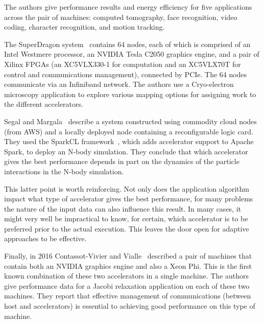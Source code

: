 The authors give performance results and energy efficiency for five
applications across the pair of machines:
computed tomography, face recognition, video coding, character recognition,
and motion tracking.

The SuperDragon system~\cite{tzwz15} contains 64 nodes, each of which is
comprised of an Intel Westmere processor, an NVIDIA Tesla C2050 graphics
engine, and a pair of Xilinx FPGAs (an XC5VLX330-1 for computation and an
XC5VLX70T for control and communications management), connected by
PCIe. The 64 nodes communicate via
an Infiniband network. The authors use a Cryo-electron microscopy
application to explore various mapping options for assigning work to the
different accelerators.

Segal and Margala~\cite{sm16} describe a system constructed using commodity cloud
nodes (from AWS) and a locally deployed node containing a reconfigurable logic
card.  They used the SparkCL framework~\cite{sparkcl}, which adds accelerator
support to Apache Spark, to deploy an N-body simulation. They conclude that
which accelerator gives the best performance depends in part on the dynamics
of the particle interactions in the N-body simulation.

This latter point is worth reinforcing. Not only does the application
algorithm impact what type of accelerator gives the best performance, for
many problems the nature of the input data can also influence this result.
In many cases, it might very well be impractical to know, for certain,
which accelerator is to be preferred prior to the actual execution.
This leaves the door open for adaptive approaches to be effective.

Finally, in 2016 Contassot-Vivier and Vialle~\cite{cv16} described
a pair of machines
that contain both an NVIDIA graphics engine and also a Xeon Phi. This is
the first known combination of these two accelerators in a single machine.
The authors give performance data for a Jacobi relaxation application
on each of these two machines.
They report that effective management of communications (between host and
accelerators) is essential to achieving good performance on this type of
machine.
